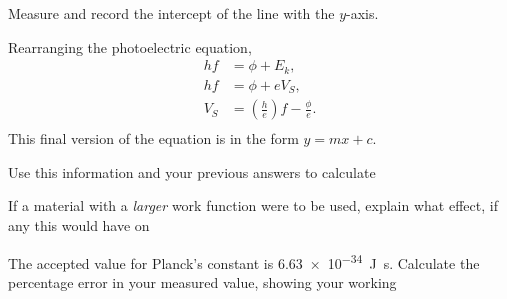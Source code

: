 \begin{questions}
\question Measure and record the intercept of the line with the $y$-axis. \answerline

Rearranging the photoelectric equation,
\begin{align*}
hf&=\phi+E_{k},\\
hf&=\phi+eV_{S},\\
V_{S}&=\left(\frac{h}{e}\right)f-\frac{\phi}{e}.\\
\end{align*}
This final version of the equation is in the form $y=mx+c$.

\question Use this information and your previous answers to calculate

\question If a material with a \emph{larger} work function were to be used, explain what effect, if any this would have on

\question The accepted value for Planck's constant is \SI{6.63e-34}{J.s}.  Calculate the percentage error in your measured value, showing your working
\fillwithlines{2cm}

\end{questions}
